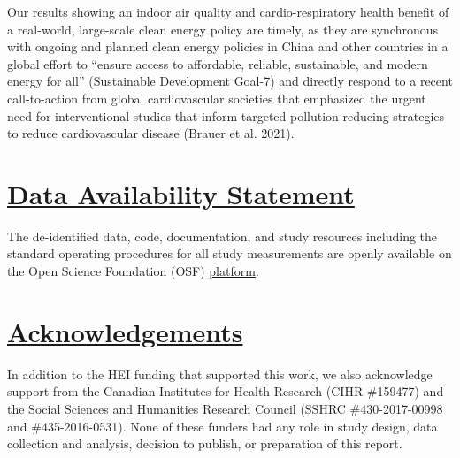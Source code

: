 \documentclass[
  letterpaper,
  DIV=11,
  numbers=noendperiod]{scrartcl}
\providecommand{\DIFadd}[1]{{\protect\color{blue}\underline{#1}}} %
\providecommand{\DIFaddbegin}{} %
\providecommand{\DIFaddend}{} %
\providecommand{\DIFdelbegin}{} %
\providecommand{\DIFdelend}{} %
\newcommand{\DIFscaledelfig}{0.5}
\newlength{\DIFdelgraphicswidth} %
\newlength{\DIFdelgraphicsheight} %
\newcommand{\DIFaddincludegraphics}[2][]{{\color{blue}\fbox{\DIFOincludegraphics[#1]{#2}}}} %
\newcommand{\DIFdelincludegraphics}[2][]{%
\sbox{\DIFdelgraphicsbox}{\DIFOincludegraphics[#1]{#2}}%
\settoboxwidth{\DIFdelgraphicswidth}{\DIFdelgraphicsbox} %
\settoboxtotalheight{\DIFdelgraphicsheight}{\DIFdelgraphicsbox} %
\scalebox{\DIFscaledelfig}{%
\parbox[b]{\DIFdelgraphicswidth}{\usebox{\DIFdelgraphicsbox}\\[-\baselineskip] \rule{\DIFdelgraphicswidth}{0em}}\llap{\resizebox{\DIFdelgraphicswidth}{\DIFdelgraphicsheight}{%
\setlength{\unitlength}{\DIFdelgraphicswidth}%
\begin{picture}(1,1)%
\thicklines\linethickness{2pt} %
{\color[rgb]{1,0,0}\put(0,0){\framebox(1,1){}}}%
{\color[rgb]{1,0,0}\put(0,0){\line( 1,1){1}}}%
{\color[rgb]{1,0,0}\put(0,1){\line(1,-1){1}}}%
\end{picture}%
}\hspace*{3pt}}} %
} %
\DeclareRobustCommand{\DIFaddbegin}{\DIFOaddbegin \let\includegraphics\DIFaddincludegraphics} %
\DeclareRobustCommand{\DIFaddend}{\DIFOaddend \let\includegraphics\DIFOincludegraphics} %
\DeclareRobustCommand{\DIFdelbegin}{\DIFOdelbegin \let\includegraphics\DIFdelincludegraphics} %
\DeclareRobustCommand{\DIFdelend}{\DIFOaddend \let\includegraphics\DIFOincludegraphics} %
\begin{document}
Our results showing an indoor air quality and cardio-respiratory health
benefit of a real-world, large-scale clean energy policy are timely, as
they are synchronous with ongoing and planned clean energy policies in
China and other countries in a global effort to ``ensure access to
affordable, reliable, sustainable, and modern energy for all''
(Sustainable Development Goal-7) and directly respond to a recent
call-to-action from global cardiovascular societies that emphasized the
urgent need for interventional studies that inform targeted
pollution-reducing strategies to reduce cardiovascular disease (Brauer
et al. 2021).

\DIFdelbegin %
\DIFdelend \DIFaddbegin \section{\DIFadd{Data Availability Statement}}\label{data-availability-statement}
\DIFaddend 

The de-identified data, code, documentation, and study resources
including the standard operating procedures for all study measurements
are openly available on the Open Science Foundation (OSF)
\href{https://osf.io/8twds/?view_only=c41dd3d6228240d6aad92f81371c5339}{platform}.

\DIFdelbegin %
\DIFdelend \DIFaddbegin \section{\DIFadd{Acknowledgements}}\label{acknowledgements}
\DIFaddend 

In addition to the HEI funding that supported this work, we also
acknowledge support from the Canadian Institutes for Health Research
(CIHR \#159477) and the Social Sciences and Humanities Research Council
(SSHRC \#430-2017-00998 and \#435-2016-0531). None of these funders had
any role in study design, data collection and analysis, decision to
publish, or preparation of this report.
\end{document}
